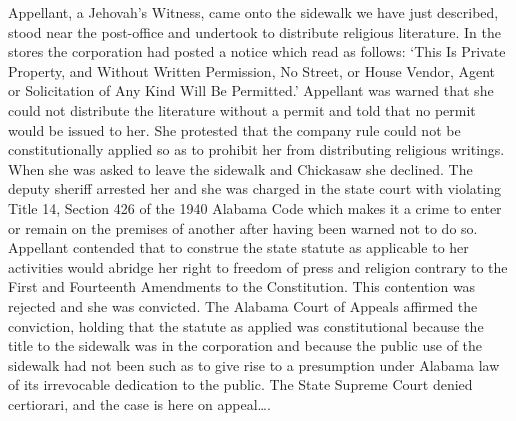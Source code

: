 Appellant, a Jehovah's Witness, came onto the sidewalk we have just described,
stood near the post-office and undertook to distribute religious literature. In
the stores the corporation had posted a notice which read as follows: `This Is
Private Property, and Without Written Permission, No Street, or House Vendor,
Agent or Solicitation of Any Kind Will Be Permitted.'  Appellant was warned
that she could not distribute the literature without a permit and told that no
permit would be issued to her. She protested that the company rule could not be
constitutionally applied so as to prohibit her from distributing religious
writings. When she was asked to leave the sidewalk and Chickasaw she declined.
The deputy sheriff arrested her and she was charged in the state court with
violating Title 14, Section 426 of the 1940 Alabama Code which makes it a crime
to enter or remain on the premises of another after having been warned not to
do so. Appellant contended that to construe the state statute as applicable to
her activities would abridge her right to freedom of press and religion
contrary to the First and Fourteenth Amendments to the Constitution. This
contention was rejected and she was convicted. The Alabama Court of Appeals
affirmed the conviction, holding that the statute as applied was constitutional
because the title to the sidewalk was in the corporation and because the public
use of the sidewalk had not been such as to give rise to a presumption under
Alabama law of its irrevocable dedication to the public. The State Supreme
Court denied certiorari, and the case is here on appeal\ldots.

